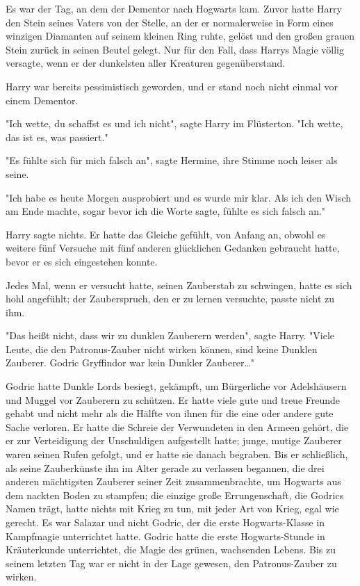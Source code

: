 {Es war der Tag, an dem der Dementor nach Hogwarts kam. Zuvor hatte Harry den Stein seines Vaters von der Stelle, an der er normalerweise in Form eines winzigen Diamanten auf seinem kleinen Ring ruhte, gelöst und den großen grauen Stein zurück in seinen Beutel gelegt. Nur für den Fall, dass Harrys Magie völlig versagte, wenn er der dunkelsten aller Kreaturen gegenüberstand.

Harry war bereits pessimistisch geworden, und er stand noch nicht einmal vor einem Dementor.

"Ich wette, du schaffst es und ich nicht", sagte Harry im Flüsterton. "Ich wette, das ist es, was passiert."

"Es fühlte sich für mich falsch an", sagte Hermine, ihre Stimme noch leiser als seine.

"Ich habe es heute Morgen ausprobiert und es wurde mir klar. Als ich den Wisch am Ende machte, sogar bevor ich die Worte sagte, fühlte es sich falsch an."

Harry sagte nichts. Er hatte das Gleiche gefühlt, von Anfang an, obwohl es weitere fünf Versuche mit fünf anderen glücklichen Gedanken gebraucht hatte, bevor er es sich eingestehen konnte.

Jedes Mal, wenn er versucht hatte, seinen Zauberstab zu schwingen, hatte es sich hohl angefühlt; der Zauberspruch, den er zu lernen versuchte, passte nicht zu ihm.

"Das heißt nicht, dass wir zu dunklen Zauberern werden", sagte Harry. "Viele Leute, die den Patronus-Zauber nicht wirken können, sind keine Dunklen Zauberer. Godric Gryffindor war kein Dunkler Zauberer…"

Godric hatte Dunkle Lords besiegt, gekämpft, um Bürgerliche vor Adelshäusern und Muggel vor Zauberern zu schützen. Er hatte viele gute und treue Freunde gehabt und nicht mehr als die Hälfte von ihnen für die eine oder andere gute Sache verloren. Er hatte die Schreie der Verwundeten in den Armeen gehört, die er zur Verteidigung der Unschuldigen aufgestellt hatte; junge, mutige Zauberer waren seinen Rufen gefolgt, und er hatte sie danach begraben. Bis er schließlich, als seine Zauberkünste ihn im Alter gerade zu verlassen begannen, die drei anderen mächtigsten Zauberer seiner Zeit zusammenbrachte, um Hogwarts aus dem nackten Boden zu stampfen; die einzige große Errungenschaft, die Godrics Namen trägt, hatte nichts mit Krieg zu tun, mit jeder Art von Krieg, egal wie gerecht. Es war Salazar und nicht Godric, der die erste Hogwarts-Klasse in Kampfmagie unterrichtet hatte. Godric hatte die erste Hogwarts-Stunde in Kräuterkunde unterrichtet, die Magie des grünen, wachsenden Lebens. Bis zu seinem letzten Tag war er nicht in der Lage gewesen, den Patronus-Zauber zu wirken.

}
